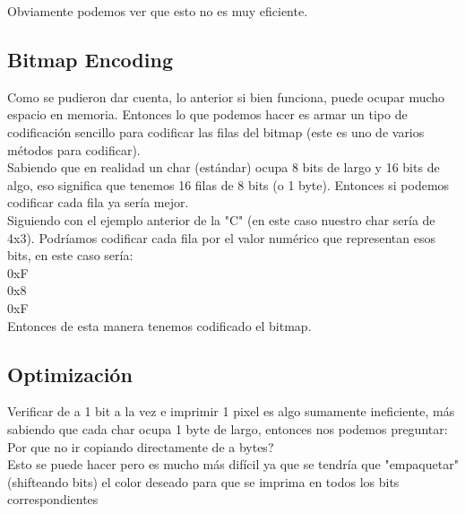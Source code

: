 \documentclass[]{article}
\begin{document}
Obviamente podemos ver que esto no es muy eficiente.\\

\subsection*{Bitmap Encoding}
Como se pudieron dar cuenta, lo anterior si bien funciona, puede ocupar mucho espacio en memoria. Entonces lo que podemos hacer es armar un tipo de codificaci\'on sencillo para codificar las filas del bitmap (este es uno de varios m\'etodos para codificar).\\

Sabiendo que en realidad un char (est\'andar) ocupa 8 bits de largo y 16 bits de algo, eso significa que tenemos 16 filas de 8 bits (o 1 byte). Entonces si podemos codificar cada fila ya ser\'ia mejor.\\

Siguiendo con el ejemplo anterior de la "C" (en este caso nuestro char ser\'ia de 4x3). Podr\'iamos codificar cada fila por el valor num\'erico que representan esos bits, en este caso ser\'ia:\\
0xF\\
0x8\\
0xF\\
Entonces de esta manera tenemos codificado el bitmap.

\subsection*{Optimizaci\'on}
Verificar de a 1 bit a la vez e imprimir 1 pixel es algo sumamente ineficiente, m\'as sabiendo que cada char ocupa 1 byte de largo, entonces nos podemos preguntar: Por que no ir copiando directamente de a bytes?\\

Esto se puede hacer pero es mucho m\'as dif\'icil ya que se tendr\'ia que "empaquetar" (shifteando bits) el color deseado para que se imprima en todos los bits correspondientes
\end{document}
